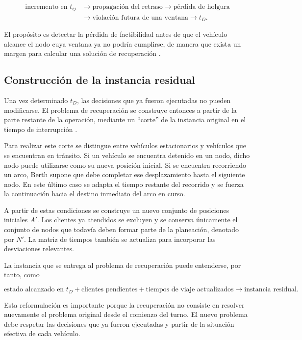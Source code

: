 \documentclass[11pt]{article}
\begin{document}
\[
\begin{aligned}
\text{incremento en } t_{ij}
&\longrightarrow
\text{propagación del retraso}
\longrightarrow
\text{pérdida de holgura}
\\
&\longrightarrow
\text{violación futura de una ventana}
\longrightarrow
t_D.
\end{aligned}
\]

El propósito es detectar la pérdida de factibilidad antes de que el vehículo alcance
el nodo cuya ventana ya no podría cumplirse, de manera que exista un margen para
calcular una solución de recuperación
\parencite{berth_thesis_2025}.

\subsection{Construcción de la instancia residual}
\label{sec:instancia_residual}

Una vez determinado \(t_D\), las decisiones que ya fueron ejecutadas no pueden
modificarse. El problema de recuperación se construye entonces a partir de la parte
restante de la operación, mediante un ``corte'' de la instancia original en el tiempo
de interrupción
\parencite{berth_thesis_2025}.

Para realizar este corte se distingue entre vehículos estacionarios y vehículos que se
encuentran en tránsito. Si un vehículo se encuentra detenido en un nodo, dicho nodo
puede utilizarse como su nueva posición inicial. Si se encuentra recorriendo un arco,
Berth supone que debe completar ese desplazamiento hasta el siguiente nodo. En este
último caso se adapta el tiempo restante del recorrido y se fuerza la continuación
hacia el destino inmediato del arco en curso.

A partir de estas condiciones se construye un nuevo conjunto de posiciones iniciales
\(A'\). Los clientes ya atendidos se excluyen y se conserva únicamente el conjunto
de nodos que todavía deben formar parte de la planeación, denotado por \(N'\).
La matriz de tiempos también se actualiza para incorporar las desviaciones relevantes.

La instancia que se entrega al problema de recuperación puede entenderse, por tanto,
como

\[
\text{estado alcanzado en }t_D
+
\text{clientes pendientes}
+
\text{tiempos de viaje actualizados}
\longrightarrow
\text{instancia residual}.
\]

Esta reformulación es importante porque la recuperación no consiste en resolver
nuevamente el problema original desde el comienzo del turno. El nuevo problema debe
respetar las decisiones que ya fueron ejecutadas y partir de la situación efectiva de
cada vehículo.
\end{document}
